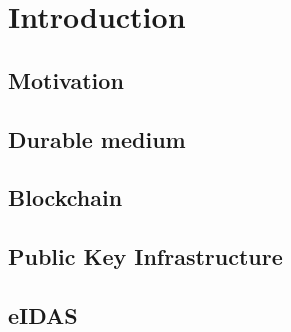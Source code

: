 \newpage
\section{Introduction}
\subsection{Motivation}
\subsection{Durable medium}
\subsection{Blockchain}
\subsection{Public Key Infrastructure}
\subsection{eIDAS}